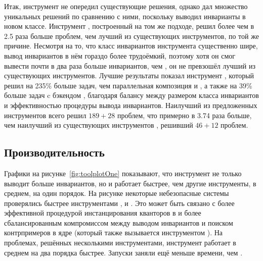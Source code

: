 Итак, инструмент \ringen{\cvc{}} не опередил существующие решения, однако дал множество уникальных решений по сравнению с ними, поскольку выводил инварианты в новом классе. Инструмент \ringen{\vampire{}}, построенный на том же подходе, решил более чем в 2.5 раза больше проблем, чем лучший из существующих инструментов, по той же причине. Несмотря на то, что класс инвариантов инструмента \ringenSync{} существенно шире, вывод инвариантов в нём гораздо более трудоёмкий, поэтому хотя он смог вывести почти в два раза больше инвариантов, чем \ringen{\cvc{}}, он не превзошёл лучший из существующих инструментов. Лучшие результаты показал инструмент \ringenCICI{\cvc{}}, который решил на 235\% больше задач, чем параллельная композиция \racer{} и \ringen{\cvc{}}, а также на 39\% больше задач c бэкендом \vampire{}, благодаря балансу между размером класса инвариантов и эффективностью процедуры вывода инвариантов. Наилучший из предложенных инструментов \ringenCICI{\vampire{}} всего решил $189+28$ проблем, что примерно в 3.74 раза больше, чем наилучший из существующих инструментов \eldarica{}, решивший $46+12$ проблем.

\subsection{Производительность}\label{sec:evaluation/performance}

\toolplotOne{}

Графики на рисунке~\ref{fig:toolplotOne} показывают, что инструмент \ringen{\cvc{}} не только выводит больше инвариантов, но и работает быстрее, чем другие инструменты, в среднем, на один порядок. На рисунке некоторые небезопасные системы проверялись быстрее инструментами \cvcind{}, \vericat{} и \racer{}. Это может быть связано с более эффективной процедурой инстанцирования кванторов в \cvcind{} и более сбалансированным компромиссом между выводом инвариантов и поиском контрпримеров в ядре \racer{} (который также вызывается инструментом \vericat{}).
На проблемах, решённых несколькими инструментами, инструмент \ringen{\cvc} работает в среднем на два порядка быстрее.
Запуски \ringen{\vampire{}} заняли ещё меньше времени, чем \ringen{\cvc}.

